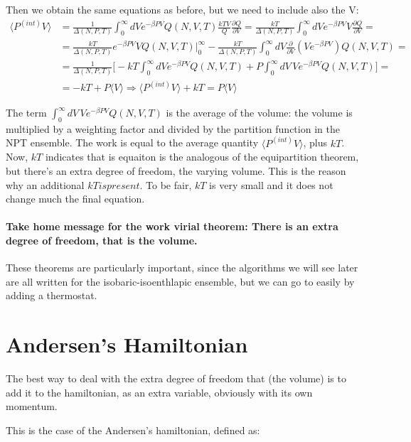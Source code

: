 Then we obtain the same equations as before, but we need to include also the V:
	\begin{align*}
		\langle P^{(int)}V\rangle &= \frac{1}{\Delta(N, P, T)}\int_0^{\infty}dVe^{-\beta PV}Q(N, V, T)\frac{kTV}{Q}\frac{\partial Q}{\partial V} = \frac{kT}{\Delta(N, P, T)}\int_0^{\infty}dVe^{-\beta PV}V\frac{\partial Q}{\partial V} = \\
															&=\frac{kT}{\Delta(N, P, T)}e^{-\beta PV}VQ(N, V, T)|_{0}^{\infty}-\frac{kT}{\Delta(N, P, T)}\int_0^{\infty}dV\frac{\partial}{\partial V}(Ve^{-\beta PV})Q(N, V, T)=\\
															&= \frac{1}{\Delta(N, P, T)}\biggl[-kT\int_0^{\infty}dVe^{-\beta PV}Q(N, V, T) + P\int_0^{\infty}dV \, Ve^{-\beta PV}Q(N, V, T)\biggr]=\\
															&=-kT+P\langle V\rangle \Rightarrow \langle P^{(int)}V\rangle + kT = P\langle V\rangle
	\end{align*}
	
	The term $\int_0^{\infty}dV \, Ve^{-\beta PV}Q(N, V, T)$ is the average of the volume: the volume is multiplied by a weighting factor and divided by the partition function in the NPT ensemble. 
	The work is equal to the average quantity $\langle P^{(int)}V\rangle$, plus $kT$.
	Now, $kT$ indicates that is equaiton is the analogous of the equipartition theorem, but there's an extra degree of freedom, the varying volume. This is the reason why an additional $kT is present$.
	To be fair, $kT$ is very small and it does not change much the final equation.
	

	 \paragraph{Take home message for the work virial theorem: There is an extra degree of freedom, that is the volume.}
	
	These theorems are particularly important, since the algorithms we will see later are all written for the isobaric-isoenthlapic ensemble, but we can go to easily by adding a thermostat. 
	

\section{Andersen's Hamiltonian}
The best way to deal with the extra degree of freedom that (the volume) is to add it to the hamiltonian, as an extra variable, obviously with its own momentum.

This is the case of the Andersen's hamiltonian, defined as:

